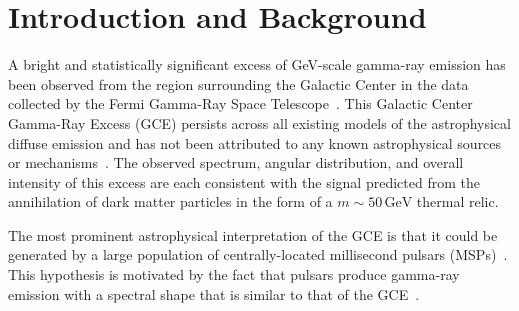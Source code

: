 \section{Introduction and Background}

A bright and statistically significant excess of GeV-scale gamma-ray emission has been observed from the region surrounding the Galactic Center in the data collected by the Fermi Gamma-Ray Space Telescope~\cite{Goodenough:2009gk,Hooper:2010mq,Hooper:2011ti,Abazajian:2012pn,Hooper:2013rwa,Gordon:2013vta,Daylan:2014rsa,Calore:2014xka,Fermi-LAT:2015sau,Fermi-LAT:2017opo}. This Galactic Center Gamma-Ray Excess (GCE) persists across all existing models of the astrophysical diffuse emission and has not been attributed to any known astrophysical sources or mechanisms~\cite{Cholis:2021rpp,DiMauro:2021raz}. The observed spectrum, angular distribution, and overall intensity of this excess are each consistent with the signal predicted from the annihilation of dark matter particles in the form of a $m\sim 50 \, \textrm{GeV}$ thermal relic.

The most prominent astrophysical interpretation of the GCE is that it could be generated by a large population of centrally-located millisecond pulsars (MSPs)~\cite{Hooper:2010mq,Abazajian:2010zy,Hooper:2011ti,Abazajian:2012pn,Gordon:2013vta,Cholis:2014lta,Yuan:2014rca,Petrovic:2014xra,Brandt:2015ula,Malyshev:2024obk,Kuvatova:2024bdn}. This hypothesis is motivated by the fact that pulsars produce gamma-ray emission with a spectral shape that is similar to that of the GCE~\cite{Baltz:2006sv,Hooper:2010mq,Hooper:2011ti,Abazajian:2012pn,Gordon:2013vta}. 

